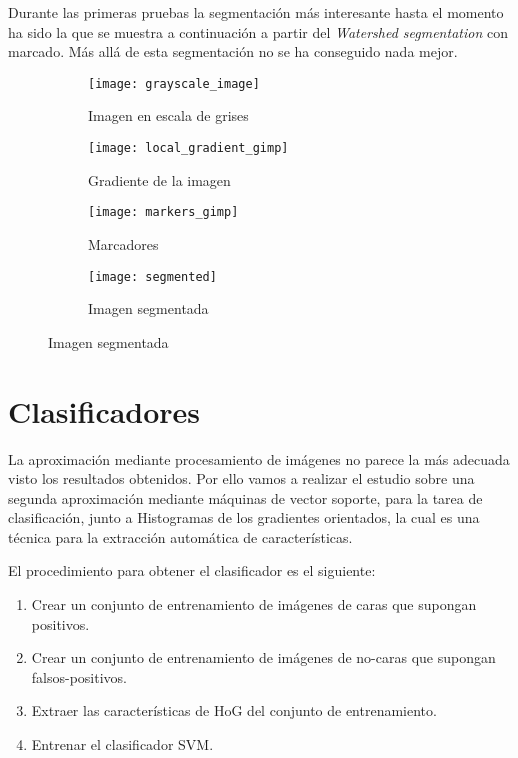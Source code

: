 Durante las primeras pruebas la segmentación más interesante hasta el momento ha sido la que se muestra a continuación a partir del \textit{Watershed segmentation} con marcado. Más allá de esta segmentación no se ha conseguido nada mejor.

\begin{figure}
	\centering
	\begin{subfigure}[b]{0.45\textwidth}
        \texttt{[image: grayscale\_image]}
        \caption{Imagen en escala de grises}
    \end{subfigure}
    \begin{subfigure}[b]{0.45\textwidth}
        \texttt{[image: local\_gradient\_gimp]}
        \caption{Gradiente de la imagen}
    \end{subfigure}
    \begin{subfigure}[b]{0.45\textwidth}
        \texttt{[image: markers\_gimp]}
        \caption{Marcadores}
    \end{subfigure}
        \begin{subfigure}[b]{0.45\textwidth}
        \texttt{[image: segmented]}
        \caption{Imagen segmentada}
    \end{subfigure}
\end{figure} 	

\section{Clasificadores}
La aproximación mediante procesamiento de imágenes no parece la más adecuada visto los resultados obtenidos. Por ello vamos a realizar el estudio sobre una segunda aproximación  mediante máquinas de vector soporte, para la tarea de clasificación, junto a Histogramas de los gradientes orientados, la cual es una técnica para la extracción automática de características.

El procedimiento para obtener el clasificador es el siguiente:

\begin{enumerate}[1.]
  \item Crear un conjunto de entrenamiento de imágenes de caras que supongan positivos.
  \item Crear un conjunto de entrenamiento de imágenes de no-caras que supongan falsos-positivos.
  \item Extraer las características de HoG del conjunto de entrenamiento.
  \item Entrenar el clasificador SVM.
\end{enumerate}

